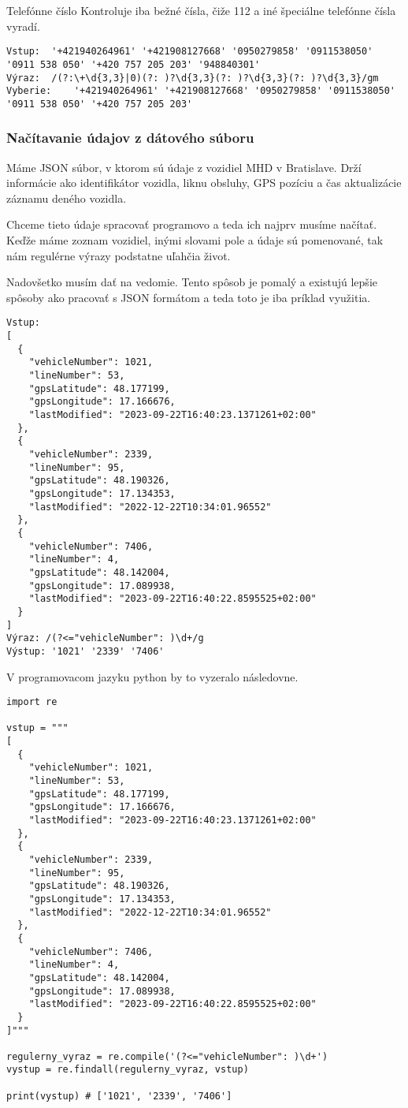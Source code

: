 \documentclass[10pt,twoside,slovak,a4paper]{article}
\begin{document}
Telefónne číslo
Kontroluje iba bežné čísla, čiže 112 a iné špeciálne telefónne čísla vyradí.

\begin{verbatim}
Vstup:	'+421940264961' '+421908127668' '0950279858' '0911538050' '0911 538 050' '+420 757 205 203' '948840301'
Výraz:	/(?:\+\d{3,3}|0)(?: )?\d{3,3}(?: )?\d{3,3}(?: )?\d{3,3}/gm
Vyberie:	'+421940264961' '+421908127668' '0950279858' '0911538050' '0911 538 050' '+420 757 205 203'
\end{verbatim}

\subsubsection{Načítavanie údajov z dátového súboru}

Máme JSON súbor, v ktorom sú údaje z vozidiel MHD v Bratislave. Drží informácie ako identifikátor vozidla, liknu obsluhy, GPS pozíciu a čas aktualizácie záznamu deného vozidla. 

Chceme tieto údaje spracovať programovo a teda ich najprv musíme načítať. Keďže máme zoznam vozidiel, inými slovami pole a údaje sú pomenované, tak nám regulérne výrazy podstatne uľahčia život.

Nadovšetko musím dať na vedomie. Tento spôsob je pomalý a existujú lepšie spôsoby ako pracovať s JSON formátom a teda toto je iba príklad využitia.

\begin{verbatim}
Vstup:
[
  {
    "vehicleNumber": 1021,
    "lineNumber": 53,
    "gpsLatitude": 48.177199,
    "gpsLongitude": 17.166676,
    "lastModified": "2023-09-22T16:40:23.1371261+02:00"
  },
  {
    "vehicleNumber": 2339,
    "lineNumber": 95,
    "gpsLatitude": 48.190326,
    "gpsLongitude": 17.134353,
    "lastModified": "2022-12-22T10:34:01.96552"
  },
  {
    "vehicleNumber": 7406,
    "lineNumber": 4,
    "gpsLatitude": 48.142004,
    "gpsLongitude": 17.089938,
    "lastModified": "2023-09-22T16:40:22.8595525+02:00"
  }
]
Výraz: /(?<="vehicleNumber": )\d+/g
Výstup: '1021' '2339' '7406'
\end{verbatim}

V programovacom jazyku python by to vyzeralo následovne.
\begin{verbatim}
import re

vstup = """
[
  {
    "vehicleNumber": 1021,
    "lineNumber": 53,
    "gpsLatitude": 48.177199,
    "gpsLongitude": 17.166676,
    "lastModified": "2023-09-22T16:40:23.1371261+02:00"
  },
  {
    "vehicleNumber": 2339,
    "lineNumber": 95,
    "gpsLatitude": 48.190326,
    "gpsLongitude": 17.134353,
    "lastModified": "2022-12-22T10:34:01.96552"
  },
  {
    "vehicleNumber": 7406,
    "lineNumber": 4,
    "gpsLatitude": 48.142004,
    "gpsLongitude": 17.089938,
    "lastModified": "2023-09-22T16:40:22.8595525+02:00"
  }
]"""

regulerny_vyraz = re.compile('(?<="vehicleNumber": )\d+')
vystup = re.findall(regulerny_vyraz, vstup)

print(vystup) # ['1021', '2339', '7406']
\end{verbatim}
\end{document}
